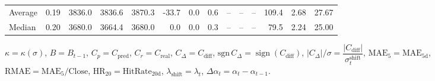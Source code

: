 \begin{threeparttable}
{\begin{tabular}{lrrrrrrrrrrrrr}
Average &     0.19 & 3836.0 & 3836.6 & 3870.3 &      -33.7 &                      0.0 &                 0.6 &         -- &        -- &             -- &            109.4 &            2.68 &                  27.67 \\
 Median &     0.20 & 3680.0 & 3664.4 & 3680.0 &        0.0 &                      0.0 &                 0.3 &         -- &        -- &             -- &             79.5 &            2.24 &                  25.00 \\
\bottomrule
\end{tabular}
}
\begin{tablenotes}\footnotesize
\item $\kappa=\kappa(\sigma)$, $B=B_{t-1}$, $C_p=C_{\text{pred}}$, $C_r=C_{\text{real}}$, $C_\Delta=C_{\text{diff}}$, $\mathrm{sgn}\,C_\Delta=\operatorname{sign}(C_{\text{diff}})$, $|C_\Delta|/\sigma=\dfrac{|C_{\text{diff}}|}{\sigma_t^{\text{shift}}}$, $\mathrm{MAE}_5=\mathrm{MAE}_{5\text{d}}$, $\mathrm{RMAE}= \mathrm{MAE}_5 / \text{Close}$, $\mathrm{HR}_{20}=\mathrm{HitRate}_{20\text{d}}$, 
$\lambda_{\text{shift}}=\lambda_t$, 
$\Delta\alpha_t=\alpha_t-\alpha_{t-1}$.
\end{tablenotes}
\end{threeparttable}
\endgroup

